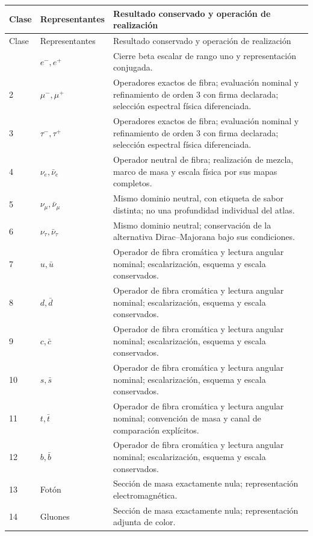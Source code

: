 \begin{longtable}{@{}p{.11\linewidth}p{.20\linewidth}p{.62\linewidth}@{}}
 \toprule
 Clase&Representantes&Resultado conservado y operación de realización\\
 \midrule\endfirsthead
 \toprule Clase&Representantes&Resultado conservado y operación de realización\\
 \midrule\endhead
 \bottomrule\endfoot
 1&\(e^-,e^+\)&Cierre beta escalar de rango uno y representación conjugada.\\
 2&\(\mu^-,\mu^+\)&Operadores exactos de fibra; evaluación nominal y refinamiento de orden \(3\) con firma declarada; selección espectral física diferenciada.\\
 3&\(\tau^-,\tau^+\)&Operadores exactos de fibra; evaluación nominal y refinamiento de orden \(3\) con firma declarada; selección espectral física diferenciada.\\
 4&\(\nu_e,\bar\nu_e\)&Operador neutral de fibra; realización de mezcla, marco de masa y escala física por sus mapas completos.\\
 5&\(\nu_\mu,\bar\nu_\mu\)&Mismo dominio neutral, con etiqueta de sabor distinta; no una profundidad individual del atlas.\\
 6&\(\nu_\tau,\bar\nu_\tau\)&Mismo dominio neutral; conservación de la alternativa Dirac--Majorana bajo sus condiciones.\\
 7&\(u,\bar u\)&Operador de fibra cromática y lectura angular nominal; escalarización, esquema y escala conservados.\\
 8&\(d,\bar d\)&Operador de fibra cromática y lectura angular nominal; escalarización, esquema y escala conservados.\\
 9&\(c,\bar c\)&Operador de fibra cromática y lectura angular nominal; escalarización, esquema y escala conservados.\\
 10&\(s,\bar s\)&Operador de fibra cromática y lectura angular nominal; escalarización, esquema y escala conservados.\\
 11&\(t,\bar t\)&Operador de fibra cromática y lectura angular nominal; convención de masa y canal de comparación explícitos.\\
 12&\(b,\bar b\)&Operador de fibra cromática y lectura angular nominal; escalarización, esquema y escala conservados.\\
 13&Fotón&Sección de masa exactamente nula; representación electromagnética.\\
 14&Gluones&Sección de masa exactamente nula; representación adjunta de color.\\

\end{longtable}
